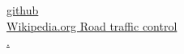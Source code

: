 \href{https://github.com/FontysVenlo/prj4-2020-app-ios-2020-group09/}{github}  \\
\href{https://en.wikipedia.org/wiki/Road_traffic_control/}{Wikipedia.org Road traffic control}  \\
\href{/}{.}  \\